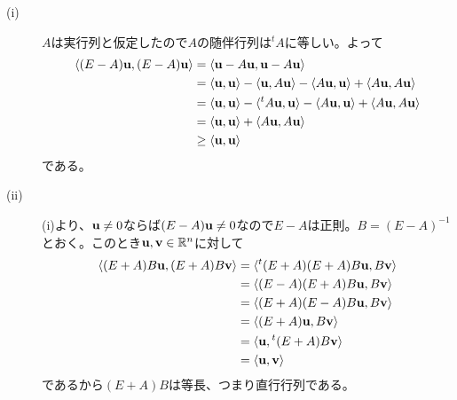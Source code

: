 \newpage

\subsubsection{}%
\begin{sol} ${}$
  \begin{description}
    \item[(i)] $A$は実行列と仮定したので$A$の随伴行列は${}^t A$に等しい。よって
    \begin{align*}
      \langle  (E-A)\textbf{u}, (E-A)\textbf{u} \rangle &= \langle  \textbf{u} - A \textbf{u}, \textbf{u} - A \textbf{u} \rangle \\
      &= \langle  \textbf{u}, \textbf{u} \rangle - \langle  \textbf{u}, A \textbf{u} \rangle - \langle  A \textbf{u}, \textbf{u} \rangle + \langle A \textbf{u}, A \textbf{u} \rangle \\
      &= \langle  \textbf{u}, \textbf{u} \rangle - \langle  {}^t A \textbf{u},  \textbf{u} \rangle - \langle  A \textbf{u}, \textbf{u} \rangle + \langle A \textbf{u}, A \textbf{u} \rangle \\
      &= \langle  \textbf{u}, \textbf{u} \rangle + \langle A \textbf{u}, A \textbf{u} \rangle \\
      &\geq  \langle  \textbf{u}, \textbf{u} \rangle
    \end{align*}
    である。
    \item[(ii)] (i)より、$\textbf{u} \neq 0$ならば$(E-A)\textbf{u} \neq 0$なので$E-A$は正則。$B = (E-A)^{-1}$とおく。このとき$\textbf{u}, \textbf{v} \in {\mathbb R}^n$に対して
    \begin{align*}
      \langle (E+A)B \textbf{u}, (E+A)B \textbf{v} \rangle &= \langle  {}^t (E+A) (E+A)B \textbf{u}, B \textbf{v}  \rangle \\
      &= \langle  (E-A) (E+A)B \textbf{u}, B \textbf{v}  \rangle \\
      &= \langle  (E+A) (E-A)B \textbf{u}, B \textbf{v}  \rangle \\
      &= \langle  (E+A)  \textbf{u}, B \textbf{v}  \rangle \\
        &= \langle    \textbf{u}, {}^t (E+A)B \textbf{v}  \rangle \\
    &= \langle    \textbf{u}, \textbf{v}  \rangle
    \end{align*}
    であるから$(E+A)B $は等長、つまり直行行列である。
  \end{description}
\end{sol}

